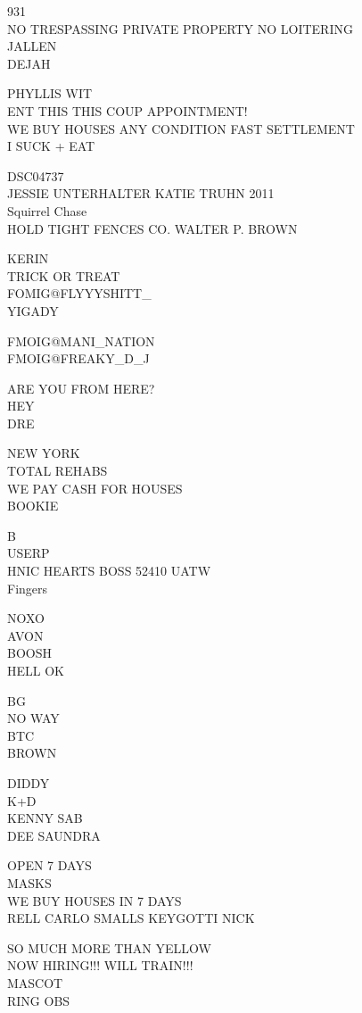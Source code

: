 \documentclass[10pt,letterpaper]{article}
\begin{document}
931\\
NO TRESPASSING PRIVATE PROPERTY NO LOITERING\\
JALLEN\\
DEJAH

PHYLLIS WIT\\
ENT THIS THIS COUP APPOINTMENT!\\
WE BUY HOUSES ANY CONDITION FAST SETTLEMENT\\
I SUCK + EAT

DSC04737\\
JESSIE UNTERHALTER KATIE TRUHN 2011\\
Squirrel Chase\\
HOLD TIGHT FENCES CO. WALTER P. BROWN

KERIN\\
TRICK OR TREAT\\
FOMIG@FLYYYSHITT\_\\
YIGADY

FMOIG@MANI\_NATION\\
FMOIG@FREAKY\_D\_J

ARE YOU FROM HERE?\\
HEY\\
DRE

NEW YORK\\
TOTAL REHABS\\
WE PAY CASH FOR HOUSES\\
BOOKIE

B\\
USERP\\
HNIC HEARTS BOSS 52410 UATW\\
Fingers

NOXO\\
AVON\\
BOOSH\\
HELL OK

BG\\
NO WAY\\
BTC\\
BROWN

DIDDY\\
K+D\\
KENNY SAB\\
DEE SAUNDRA

OPEN 7 DAYS\\
MASKS\\
WE BUY HOUSES IN 7 DAYS\\
RELL CARLO SMALLS KEYGOTTI NICK

SO MUCH MORE THAN YELLOW\\
NOW HIRING!!! WILL TRAIN!!!\\
MASCOT\\
RING OBS
\end{document}
